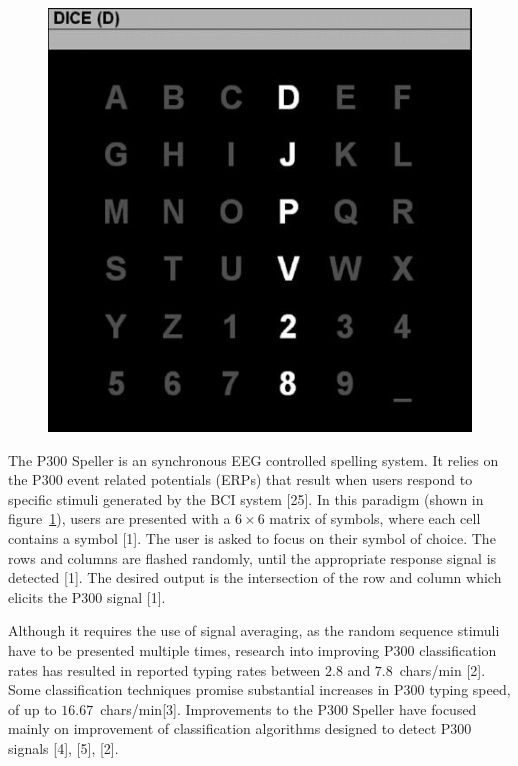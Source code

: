 \documentclass[12pt,titlepage]{article}
\begin{document}
\begin{figure}[t]
\begin{center}
	\includegraphics[scale=0.40]{Figure2.jpeg}
	\label{fig:P300}
\end{center}
\end{figure}

The P300 Speller is an synchronous EEG controlled spelling system.   It relies on the P300 event 
related potentials (ERPs) that result when users respond to specific stimuli generated by the BCI 
system [25].  In this paradigm (shown in figure~\ref{fig:P300}), users are presented with a $6\times6$ matrix of symbols, where 
each cell contains a symbol [1].  The user is asked to focus on their symbol of choice.  The rows and 
columns are flashed randomly, until the appropriate response signal is detected [1].  The desired output
is the intersection of the row and column which elicits the P300 signal [1].

Although it requires the use of signal averaging, as the random sequence stimuli have to be presented 
multiple times, research into improving P300 classification rates has resulted in reported typing rates 
between $2.8$ and $7.8$~chars/min [2].  Some classification techniques promise substantial increases in 
P300 typing speed, of up to $16.67$~chars/min[3].  Improvements to the P300 Speller have focused mainly 
on improvement of classification algorithms designed to detect P300 signals [4], [5], [2].
\end{document}

